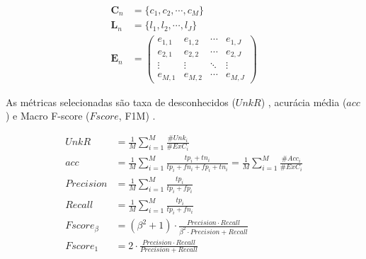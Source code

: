 \begin{align}
  \mathbf{C}_n &= \{ c_1, c_2, \cdots, c_M \}  \label{eq:classes} \\
  \mathbf{L}_n &= \{ l_1, l_2, \cdots, l_J \}  \label{eq:labels} \\
  \mathbf{E}_n &= \begin{pmatrix}
    e_{1,1} & e_{1,2} & \cdots & e_{1,J} \\
    e_{2,1} & e_{2,2} & \cdots & e_{2,J} \\
    \vdots  & \vdots  & \ddots & \vdots  \\
    e_{M,1} & e_{M,2} & \cdots & e_{M,J} 
  \end{pmatrix}  \label{eq:matrix}
\end{align}

As métricas selecionadas são taxa de desconhecidos ($UnkR$) \cite{Faria2013},
acurácia média ($acc$) e Macro F-score ($Fscore$, F1M)
\cite{Sokolova2009,DaSilva2018thesis}.



\begin{align}
  \mathit{UnkR}       &= \frac{1}{M} \sum_{i=1}^{M} \frac{\#Unk_i}{\#ExC_i}\\
  \mathit{acc}        &= \frac{1}{M} \sum_{i=1}^{M} \frac{tp_i + tn_i}{tp_i+fn_i+fp_i+tn_i}
  = \frac{1}{M} \sum_{i=1}^{M} \frac{\#Acc_i}{\#ExC_i}\\
  \mathit{Precision}  &= \frac{1}{M} \sum_{i=1}^{M} \frac{tp_i}{tp_i+fp_i} \\
  \mathit{Recall}     &= \frac{1}{M} \sum_{i=1}^{M} \frac{tp_i}{tp_i+fn_i} \\
  \mathit{Fscore}_\beta &= (\beta^2 +1) \cdot
  \frac{
  \mathit{Precision} \cdot \mathit{Recall}
  }{
    \beta^2 \cdot \mathit{Precision} +\mathit{Recall}
  }\\
  \mathit{Fscore}_1   &= 2 \cdot \frac{
    \mathit{Precision} \cdot \mathit{Recall}
    }{
      \mathit{Precision} +\mathit{Recall}
    } 
\end{align}

